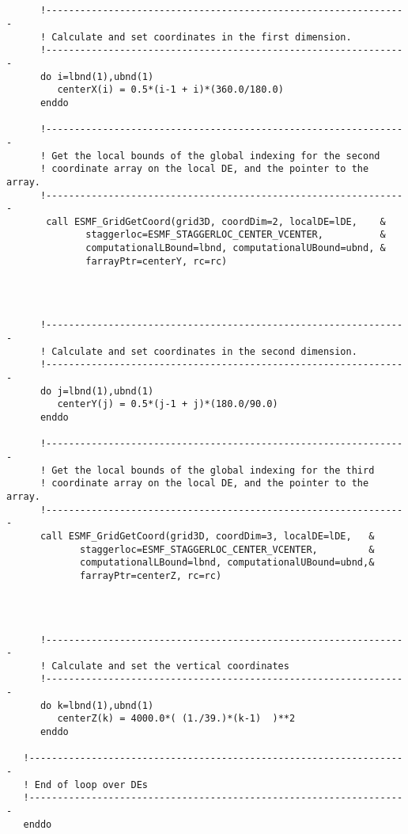 
 \begin{verbatim}


      !----------------------------------------------------------------
      ! Calculate and set coordinates in the first dimension.
      !----------------------------------------------------------------
      do i=lbnd(1),ubnd(1)
         centerX(i) = 0.5*(i-1 + i)*(360.0/180.0)
      enddo

      !----------------------------------------------------------------
      ! Get the local bounds of the global indexing for the second
      ! coordinate array on the local DE, and the pointer to the array.
      !----------------------------------------------------------------
       call ESMF_GridGetCoord(grid3D, coordDim=2, localDE=lDE,    &
              staggerloc=ESMF_STAGGERLOC_CENTER_VCENTER,          &
              computationalLBound=lbnd, computationalUBound=ubnd, &
              farrayPtr=centerY, rc=rc)
 
\end{verbatim}
 

 \begin{verbatim}


      !----------------------------------------------------------------
      ! Calculate and set coordinates in the second dimension.
      !----------------------------------------------------------------
      do j=lbnd(1),ubnd(1)
         centerY(j) = 0.5*(j-1 + j)*(180.0/90.0)
      enddo

      !----------------------------------------------------------------
      ! Get the local bounds of the global indexing for the third
      ! coordinate array on the local DE, and the pointer to the array.
      !----------------------------------------------------------------
      call ESMF_GridGetCoord(grid3D, coordDim=3, localDE=lDE,   &
             staggerloc=ESMF_STAGGERLOC_CENTER_VCENTER,         &
             computationalLBound=lbnd, computationalUBound=ubnd,&
             farrayPtr=centerZ, rc=rc)
 
\end{verbatim}
 

 \begin{verbatim}


      !----------------------------------------------------------------
      ! Calculate and set the vertical coordinates
      !----------------------------------------------------------------
      do k=lbnd(1),ubnd(1)
         centerZ(k) = 4000.0*( (1./39.)*(k-1)  )**2
      enddo

   !-------------------------------------------------------------------
   ! End of loop over DEs
   !-------------------------------------------------------------------
   enddo


 
\end{verbatim}
 
